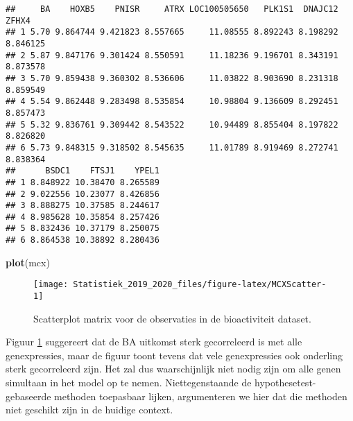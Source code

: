 \documentclass[12pt,dutch,coursenotes]{book}
\newenvironment{Shaded}{\begin{snugshade}}{\end{snugshade}}
\newcommand{\KeywordTok}[1]{\textcolor[rgb]{0.13,0.29,0.53}{\textbf{#1}}}
\newcommand{\NormalTok}[1]{#1}
\theoremstyle{definition}
\theoremstyle{definition}
\theoremstyle{definition}
\theoremstyle{remark}
\begin{document}
\begin{verbatim}
##     BA    HOXB5    PNISR     ATRX LOC100505650   PLK1S1  DNAJC12    ZFHX4
## 1 5.70 9.864744 9.421823 8.557665     11.08555 8.892243 8.198292 8.846125
## 2 5.87 9.847176 9.301424 8.550591     11.18236 9.196701 8.343191 8.873578
## 3 5.70 9.859438 9.360302 8.536606     11.03822 8.903690 8.231318 8.859549
## 4 5.54 9.862448 9.283498 8.535854     10.98804 9.136609 8.292451 8.857473
## 5 5.32 9.836761 9.309442 8.543522     10.94489 8.855404 8.197822 8.826820
## 6 5.73 9.848315 9.318502 8.545635     11.01789 8.919469 8.272741 8.838364
##      BSDC1    FTSJ1    YPEL1
## 1 8.848922 10.38470 8.265589
## 2 9.022556 10.23077 8.426856
## 3 8.888275 10.37585 8.244617
## 4 8.985628 10.35854 8.257426
## 5 8.832436 10.37179 8.250075
## 6 8.864538 10.38892 8.280436
\end{verbatim}

\begin{Shaded}
\begin{Highlighting}[]
\KeywordTok{plot}\NormalTok{(mcx)}
\end{Highlighting}
\end{Shaded}

\begin{figure}

{\centering \texttt{[image: Statistiek\_2019\_2020\_files/figure-latex/MCXScatter-1]} 

}

\caption{Scatterplot matrix voor de observaties in de bioactiviteit dataset.}\label{fig:MCXScatter}
\end{figure}

Figuur \ref{fig:MCXScatter} suggereert dat de BA uitkomst sterk
gecorreleerd is met alle genexpressies, maar de figuur toont tevens dat
vele genexpressies ook onderling sterk gecorreleerd zijn. Het zal dus
waarschijnlijk niet nodig zijn om alle genen simultaan in het model op
te nemen. Niettegenstaande de hypothesetest-gebaseerde methoden
toepasbaar lijken, argumenteren we hier dat die methoden niet geschikt
zijn in de huidige context.
\end{document}
